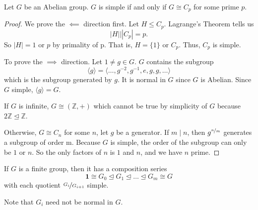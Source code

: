 \begin{lemma}
    Let \(G\) be an Abelian group. \(G\) is simple if and only if \(G \cong C_p\) for some prime \(p\).
\end{lemma}
\begin{proof}
    We prove the \(\impliedby \) direction first. Let \(H \leq C_p\). Lagrange's Theorem tells us
    \[
        \left\vert H \right\vert \big\vert \left\vert C_p \right\vert = p.
    \]
    So \(\left\vert H \right\vert = 1\) or \(p\) by primality of p. That is, \(H = \{1\}\) or \(C_p\). Thus, \(C_p\) is simple.

    To prove the \(\implies\) direction. Let \(1 \neq g \in G\). \(G\) contains the subgroup
    \[
        \langle g\rangle = \langle\ldots ,g^{-2},g^{-1},e,g,g, \ldots\rangle 
    \]
    which is the subgroup generated by \(g\). It is normal in \(G\) since \(G\) is Abelian. Since \(G\) simple, \(\langle g\rangle = G\).

    If \(G\) is infinite, \(G \cong (\mathbb{Z}, +)\) which cannot be true by simplicity of \(G\) because \(2\mathbb{Z}\trianglelefteq \mathbb{Z}\).

    Otherwise, \(G \cong C_n\) for some \(n\), let \(g\) be a generator. If \(m\mid n\), then \(g^{\nicefrac{n}{m}}\) generates a subgroup of order m. Because \(G\) is simple, the order of the subgroup can only be \(1\) or \(n\). So the only factors of \(n\) is \(1\) and \(n\), and we have \(n\) prime.
\end{proof}
\begin{lemma}
    If \(G\) is a finite group, then it has a composition series
    \[
        \textbf{1} \cong G_0 \trianglelefteq G_1 \trianglelefteq \ldots \trianglelefteq G_m \cong G
    \]
    with each quotient \(\nicefrac{G_i}{G_{i + 1}}\) simple.

    Note that \(G_i\) need not be normal in \(G\).
\end{lemma}